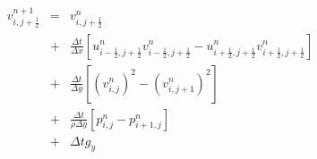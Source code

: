 \documentclass[a4paper,10pt]{article}
\begin{document}
	\begin{eqnarray}
		v^{n+1}_{i,j+\frac{1}{2}} & = & v^{n}_{i,j+\frac{1}{2}} \\
			\nonumber & + & \frac{\Delta t}{\Delta x} \left [ u^n_{i-\frac{1}{2},j+\frac{1}{2}} v^n_{i-\frac{1}{2},j+\frac{1}{2}} - u^n_{i+\frac{1}{2},j+\frac{1}{2}} v^n_{i+\frac{1}{2},j+\frac{1}{2}} \right ]\\
			\nonumber & + & \frac{\Delta t}{\Delta y} \left [ (v^{n}_{i,j})^2 - (v^{n}_{i,j+1})^2 \right ] \\
			\nonumber & + & \frac{\Delta t}{\rho \Delta y} \left [ p^{n}_{i,j} - p^{n}_{i+1,j}  \right ] \\
			\nonumber & + & \Delta t g_y
	\end{eqnarray}
	
\end{document}
